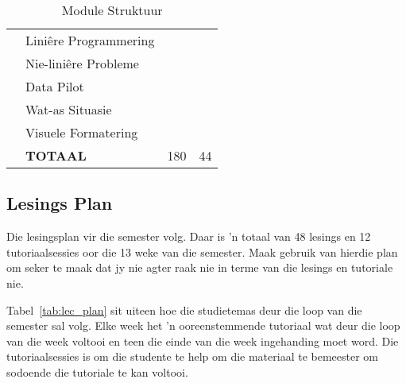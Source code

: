\begin{table}[!h]
\begin{tabular}{|p{1.4cm}|l|p{2cm}|p{2cm}|}
                    & \qquad Lini\^{e}re Programmering          &    &   \\
                    & \qquad Nie-lini\^{e}re Probleme  &    &   \\
                    & \qquad Data Pilot                         &    &   \\
                    & \qquad Wat-as Situasie                    &    &   \\
                    & \qquad Visuele Formatering                &    &   \\
                    & {\bf TOTAAL}                              &180 &44 \\
                 \hline
             \end{tabular}
             \caption{Module Struktuur} \label{tab:study_comp} 
        \end{table}

    \subsection{Lesings Plan}
	Die lesingsplan vir die semester volg.  Daar is 'n totaal van 48 lesings en 12 
         tutoriaalsessies oor die 13 weke van die semester. Maak gebruik van
         hierdie plan om seker te maak dat jy nie agter raak nie in terme van die lesings
	en tutoriale nie.
	
	Tabel~\ref{tab:lec_plan} sit uiteen hoe die studietemas deur die loop van die semester sal volg.
	Elke week het 'n ooreenstemmende tutoriaal wat deur die loop van die week voltooi en teen die	
	einde van die week ingehanding moet word. Die tutoriaalsessies is om die studente te help om
	die materiaal te bemeester om sodoende die tutoriale te kan voltooi.
        

